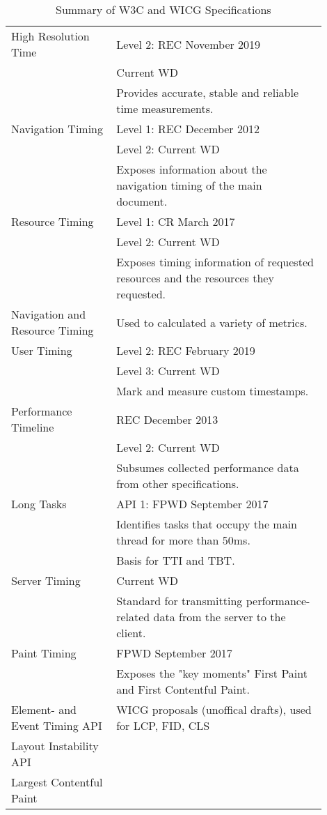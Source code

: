 \begin{table}[h]
	\small
	\centering
	\begin{tabular}{ | p{0.3\linewidth} | p{0.6\linewidth} | }
	\hline
	High Resolution Time
	& Level 2: REC November 2019 \\
	& Current WD \\
	& Provides accurate, stable and reliable time measurements. \\
	\hline
	Navigation Timing
	& Level 1: REC December 2012 \\
	& Level 2: Current WD \\
	& Exposes information about the navigation timing of the main document. \\
	\hline
	Resource Timing
	& Level 1: CR March 2017 \\
	& Level 2: Current WD \\
	& Exposes timing information of requested resources and the resources they requested. \\
	\hline
	Navigation and Resource Timing
	& Used to calculated a variety of metrics. \\
	\hline
	User Timing
	& Level 2: REC February 2019 \\
	& Level 3: Current WD \\
	& Mark and measure custom timestamps. \\
	\hline
	Performance Timeline
	& REC December 2013 \\
	& Level 2: Current WD \\
	& Subsumes collected performance data from other specifications. \\
	\hline
	Long Tasks
	& API 1: FPWD  September 2017 \\
	& Identifies tasks that occupy the main thread for more than 50ms. \\
	& Basis for TTI and TBT. \\
	\hline
	Server Timing
	& Current WD \\
	& Standard for transmitting performance-related data from the server to the client. \\
	\hline
	Paint Timing
	& FPWD September 2017 \\
	& Exposes the "key moments" First Paint and First Contentful Paint. \\
	\hline
	Element- and Event Timing API & WICG proposals (unoffical drafts), used for LCP, FID, CLS  \\
	Layout Instability API & \\ %
	Largest Contentful Paint & \\
	\hline
	\end{tabular}
	\medskip
	\caption{Summary of W3C and WICG Specifications}
	\label{table:apis_summary}
\end{table}


